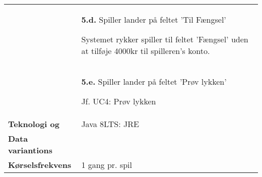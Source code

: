 \documentclass[class=article, crop=false]{standalone}
\begin{document}
\begin{table}[H]
\begin{tabularx}{\textwidth}{|l|X|}
                            & \textbf{5.d.} Spiller lander på feltet 'Til Fængsel'
                            \begin{enumerate} \begin{tabenum}
                                                  \item Systemet rykker spiller til feltet 'Fængsel' uden at tilføje 4000kr til spilleren's konto.
                            \end{tabenum} \end{enumerate}
                            \\


                            & \textbf{5.e.} Spiller lander på feltet 'Prøv lykken'
                            \begin{enumerate} \begin{tabenum}
                                                  \item Jf. UC4: Prøv lykken
                            \end{tabenum} \end{enumerate}
                            \\




            \hline








            \textbf{Teknologi og}     & Java 8LTS: JRE \\
            \textbf{Data variantions} &  \\ \hline
            \textbf{Kørselsfrekvens} & 1 gang pr. spil\\ \hline
        \end{tabularx}


    \end{table}
\end{document}
